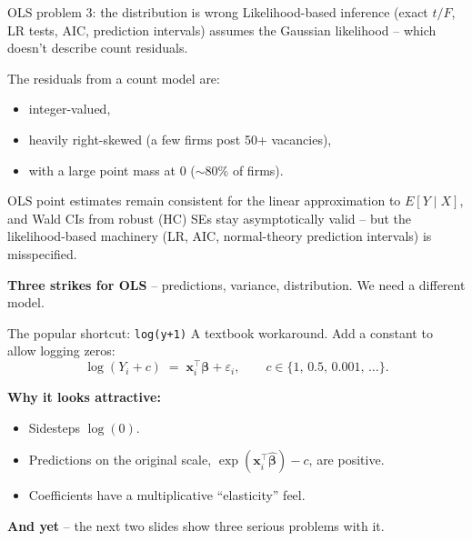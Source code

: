 \documentclass[10pt,ignorenonframetext,aspectratio=169]{beamer}
\begin{document}
\begin{frame}{OLS problem 3: the distribution is wrong}
Likelihood-based inference (exact $t/F$, LR tests, AIC, prediction intervals) assumes the Gaussian likelihood -- which doesn't describe count residuals.

\medskip
The residuals from a count model are:
\begin{itemize}
    \justifying
    \item integer-valued,
    \item heavily right-skewed (a few firms post 50+ vacancies),
    \item with a large point mass at $0$ ($\sim 80\%$ of firms).
\end{itemize}

\medskip
OLS point estimates remain consistent for the linear approximation to $E[Y \mid X]$, and Wald CIs from robust (HC) SEs stay asymptotically valid -- but the likelihood-based machinery (LR, AIC, normal-theory prediction intervals) is misspecified.

\medskip
\textbf{Three strikes for OLS} -- predictions, variance, distribution. We need a different model.
\end{frame}


\begin{frame}{The popular shortcut: \texttt{log(y+1)}}
A textbook workaround. Add a constant to allow logging zeros:
\[
\log(Y_i + c) \;=\; \mathbf{x}_i^\top \boldsymbol{\beta} + \varepsilon_i, \qquad c \in \{1,\, 0.5,\, 0.001,\, \ldots\}.
\]

\medskip
\textbf{Why it looks attractive:}
\begin{itemize}
    \justifying
    \item Sidesteps $\log(0)$.
    \item Predictions on the original scale, $\exp(\mathbf{x}_i^\top\hat{\boldsymbol{\beta}}) - c$, are positive.
    \item Coefficients have a multiplicative ``elasticity'' feel.
\end{itemize}

\medskip
\textbf{And yet} -- the next two slides show three serious problems with it.
\end{frame}
\end{document}
